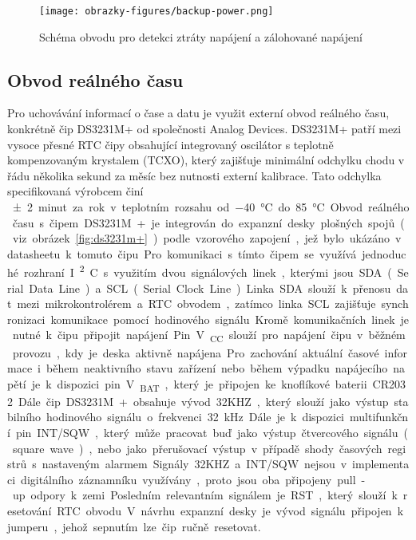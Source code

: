 \begin{figure}[h]
    \centering
    \texttt{[image: obrazky-figures/backup-power.png]}
    
    \caption{Schéma obvodu pro detekci ztráty napájení a zálohované napájení}
    \label{fig:backup-power}
\end{figure}

\newpage

\subsection{Obvod reálného času}
Pro uchovávání informací o čase a datu je využit externí obvod reálného času, konkrétně čip DS3231M+ od společnosti Analog Devices. DS3231M+ patří mezi vysoce přesné RTC čipy obsahující integrovaný oscilátor s teplotně kompenzovaným krystalem (TCXO), který zajišťuje minimální odchylku chodu v řádu několika sekund za měsíc bez nutnosti externí kalibrace. Tato odchylka specifikovaná výrobcem činí \SI{\pm2} minut za rok v teplotním rozsahu od \SI{-40}{\degreeCelsius} do \SI{+85}{\degreeCelsius}.

Obvod reálného času s čipem DS3231M+ je integrován do expanzní desky plošných spojů (viz. obrázek~\ref{fig:ds3231m+}) podle vzorového zapojení, jež bylo ukázáno v datasheetu k tomuto čipu. Pro komunikaci s tímto čipem se využívá jednoduché rozhraní I\textsuperscript{2}C s využitím dvou signálových linek, kterými jsou SDA (Serial Data Line) a SCL (Serial Clock Line). Linka SDA slouží k přenosu dat mezi mikrokontrolérem a RTC obvodem, zatímco linka SCL zajišťuje synchronizaci komunikace pomocí hodinového signálu. Kromě komunikačních linek je nutné k čipu připojit napájení. Pin V\textsubscript{CC} slouží pro napájení čipu v běžném provozu, kdy je deska aktivně napájena. Pro zachování aktuální časové informace i během neaktivního stavu zařízení nebo během výpadku napájecího napětí je k dispozici pin V\textsubscript{BAT}, který je připojen ke knoflíkové baterii CR2032.

Dále čip DS3231M+ obsahuje vývod 32KHZ, který slouží jako výstup stabilního hodinového signálu o frekvenci 32 kHz. Dále je k dispozici multifunkční pin INT/SQW, který může pracovat buď jako výstup čtvercového signálu (square wave), nebo jako přerušovací výstup v případě shody časových registrů s nastaveným alarmem. Signály 32KHZ a INT/SQW nejsou v implementaci digitálního záznamníku využívány, proto jsou oba připojeny pull-up odpory k zemi. Posledním relevantním signálem je RST, který slouží k resetování RTC obvodu. V návrhu expanzní desky je vývod signálu připojen k jumperu, jehož sepnutím lze čip ručně resetovat.

